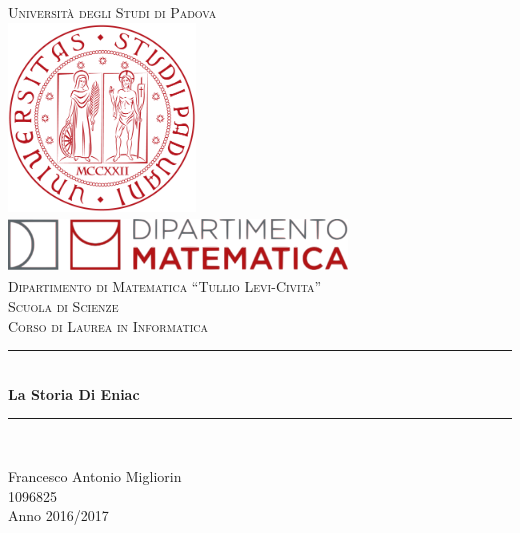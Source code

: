 \begin{titlepage}

    \newcommand{\HRule}{\rule{\linewidth}{0.5mm}} 
    
    \center
    
    
    \textsc{\LARGE Università degli Studi di Padova}\\[1cm] 
        
    \includegraphics[height=5cm]{img/UniPd.png}\\[1cm]
    
    \includegraphics[height=1.5cm, width = 9cm]{img/MathDip.png}\\
    \textsc{Dipartimento di Matematica ``Tullio Levi-Civita''}\\[1.2cm]
    \textsc{\Large Scuola di Scienze}\\[0.5cm] 
    
    \textsc{\large Corso di Laurea in Informatica}\\[0.5cm] 
    
    \vspace{2.5cm}
    
    
    \HRule \\[0.4cm]
    { \huge \bfseries La Storia Di Eniac}\\[0.4cm]
    \HRule \\[1.5cm]
    
    
    \vspace{2.5cm}
     
    
    {\large 
    	Francesco Antonio Migliorin \\ 
    	1096825 \\
    	Anno 2016/2017}\\[2cm]
    
  
    \vfill 
    
\end{titlepage}